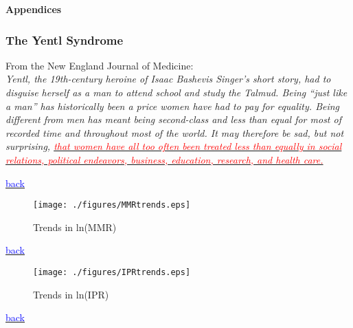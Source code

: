 \documentclass[10pt,letterpaper,subeqn]{beamer}
\begin{document}


\begin{frame}[plain]
\begin{center}
\textbf{Appendices}
\end{center}
\end{frame}


\begin{frame}[label=Yentl]
\frametitle{The Yentl Syndrome}
From the New England Journal of Medicine: \\
\vspace{4mm}
\textit{Yentl, the 19th-century heroine of Isaac Bashevis Singer's short story, 
had to disguise herself as a man to attend school and study the Talmud. Being 
``just like a man'' has historically been a price women have had to pay for 
equality. Being different from men has meant being second-class and less than 
equal for most of recorded time and throughout most of the world. It may therefore 
be sad, but not surprising, \hyperlink{intro}{\textcolor{red}{that women have all 
too often been treated less than equally in social relations, political endeavors, 
business, education, research, and health care.}}}\\
\end{frame}


\begin{frame}[plain,label=DDreg]

{\footnotesize \hyperlink{USA}{\textcolor{blue}{back}}}
\end{frame}


\begin{frame}[plain,label=ptrends]
\begin{figure}[h!]
\centering
\caption{Trends in ln(MMR)}
\texttt{[image: ./figures/MMRtrends.eps]}
\end{figure}
{\footnotesize \hyperlink{USA}{\textcolor{blue}{back}}}
\end{frame}

\begin{frame}[plain,label=ptrends]
\begin{figure}[h!]
\centering
\caption{Trends in ln(IPR)}
\texttt{[image: ./figures/IPRtrends.eps]}
\end{figure}
{\footnotesize \hyperlink{USA}{\textcolor{blue}{back}}}
\end{frame}
\end{document}
